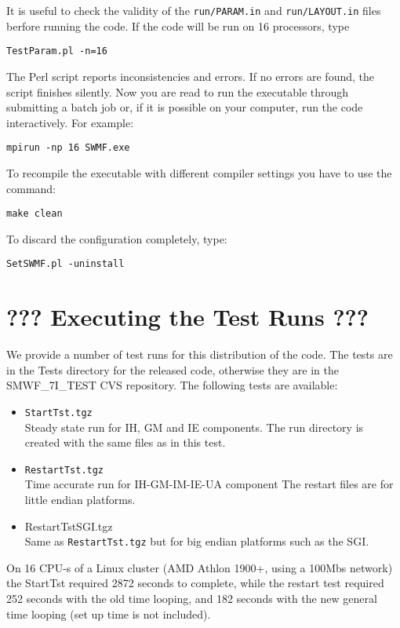 It is useful to check the validity of the {\tt run/PARAM.in} and 
{\tt run/LAYOUT.in} files berfore running the code. If the
code will be run on 16 processors, type
\begin{verbatim}
TestParam.pl -n=16
\end{verbatim}
The Perl script reports inconsistencies and errors. 
If no errors are found, the script finishes silently.
Now you are read to run the executable through submitting a batch job or, 
if it is possible on your computer, run the code interactively.  For example:
\begin{verbatim}
mpirun -np 16 SWMF.exe
\end{verbatim}
To recompile the executable with different compiler settings you have
to use the command:
\begin{verbatim}
make clean
\end{verbatim} 
To discard the configuration completely, type:
\begin{verbatim}
SetSWMF.pl -uninstall
\end{verbatim} 

\section{??? Executing the Test Runs ???}

We provide a number of test runs for this distribution of the code.
The tests are in the Tests directory for the released code, otherwise
they are in the SMWF\_7I\_TEST CVS repository.  The following tests
are available:
\begin{itemize}
\item {\tt StartTst.tgz}\\
      Steady state run for IH, GM and IE components.
      The run directory is created with the same files as in
      this test.

\item {\tt RestartTst.tgz}\\
      Time accurate run for IH-GM-IM-IE-UA component
      The restart files are for little endian platforms.

\item {RestartTstSGI.tgz}\\
      Same as {\tt RestartTst.tgz} 
      but for big endian platforms such as the SGI.
\end{itemize}
On 16 CPU-s of a Linux cluster (AMD Athlon 1900+, using a 100Mbs
network) the StartTst required 2872 seconds to complete, while the
restart test required 252 seconds with the old time looping, and 182
seconds with the new general time looping (set up time is not
included).

